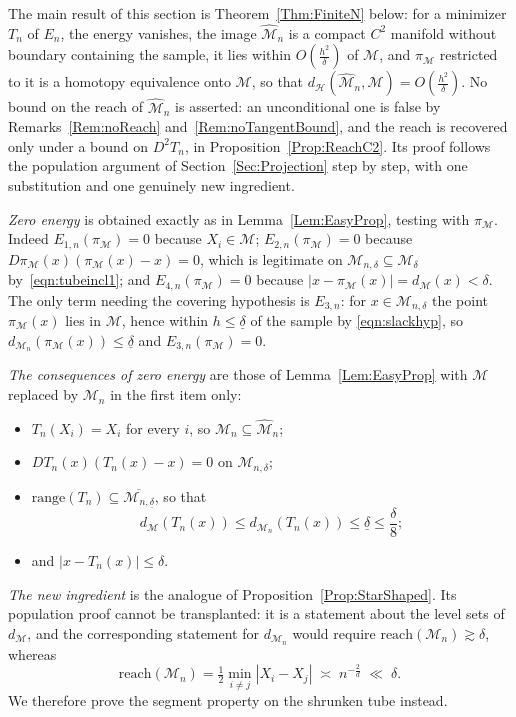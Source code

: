 \documentclass[11pt]{amsart}%
\theoremstyle{plain}
\def\calH{{\mathcal{H}}}
\newcommand{\1}{\mathbf{1}}
\newcommand{\M}{\mathcal{M}}
\begin{document}
\medskip
\noindent The main result of this section is Theorem~\ref{Thm:FiniteN} below: for a minimizer $T_n$
of $E_n$, the energy vanishes, the image $\widehat{\M}_n$ is a compact $C^2$
manifold without boundary containing the sample, it lies within $O\left(\frac{h^2}{\delta}\right)$ of $\M$, and
$\pi_\M$ restricted to it is a homotopy equivalence onto $\M$, so that
$d_\calH(\widehat{\M}_n,\M)=O\left(\frac{h^2}{\delta}\right)$. No bound on the reach of $\widehat{\M}_n$ is asserted: an
unconditional one is false by Remarks~\ref{Rem:noReach} and~\ref{Rem:noTangentBound}, and the reach
is recovered only under a bound on $D^2T_n$, in Proposition~\ref{Prop:ReachC2}. Its proof follows
the population argument of
Section~\ref{Sec:Projection} step by step, with one substitution and one genuinely new ingredient.

\emph{Zero energy} is obtained exactly as in Lemma~\ref{Lem:EasyProp}, testing with $\pi_\M$. Indeed
$E_{1,n}(\pi_\M)=0$ because $X_i\in \M$; $E_{2,n}(\pi_\M)=0$ because
$D\pi_\M(x)(\pi_\M(x)-x)=0$, which is legitimate on $\M_{n,\delta}\subseteq \M_\delta$
by~\eqref{eqn:tubeincl1}; and $E_{4,n}(\pi_\M)=0$ because $|x-\pi_\M(x)|=d_\M(x)<\delta$. The 
only term needing the covering hypothesis is $E_{3,n}$: for $x\in \M_{n,\delta}$ the point
$\pi_\M(x)$ lies in $\M$, hence within $h\le\underline\delta$ of the sample by \eqref{eqn:slackhyp},
so $d_{\M_n}(\pi_\M(x))\le \underline\delta$ and $E_{3,n}(\pi_\M)=0$.

\emph{The consequences of zero energy} are those of Lemma~\ref{Lem:EasyProp} with $\M$ replaced by
$\M_n$ in the first item only:
\begin{itemize}
    \item $T_n(X_i)=X_i$ for every $i$, so $\M_n\subseteq\widehat{\M}_n$;
    \item $DT_n(x)(T_n(x)-x)=0$ on $\M_{n,\delta}$;
    \item $\mathrm{range}(T_n)\subseteq\overline{\M_{n,\underline\delta}}$, so that $$d_\M(T_n(x))\le d_{\M_n}(T_n(x))\le\underline\delta\le\frac{\delta}{8};$$
    \item and $|x-T_n(x)|\le\delta$.
\end{itemize}

\emph{The new ingredient} is the analogue of Proposition~\ref{Prop:StarShaped}. Its population
proof cannot be transplanted: it is a statement about the level sets of $d_\M$, and the corresponding
statement for $d_{\M_n}$ would require $\mathrm{reach}(\M_n)\gtrsim\delta$, whereas
\[
    \mathrm{reach}(\M_n)=\tfrac12\min_{i\neq j}|X_i-X_j| \;\asymp\; n^{-\frac{2}{d}} \;\ll\; \delta .
\]
 We therefore prove the segment property on the shrunken tube instead.
\end{document}
